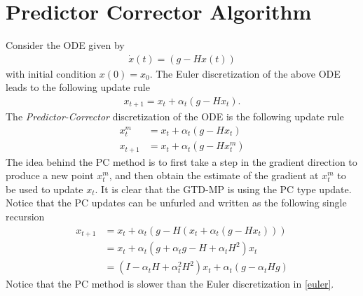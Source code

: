 \section{Predictor Corrector Algorithm}
Consider the ODE given by
\begin{align}
\dot{x}(t)=(g-Hx(t))
\end{align}
with initial condition $x(0)=x_0$. The Euler discretization of the above ODE leads to the following update rule
\begin{align}\label{euler}
x_{t+1}=x_t+\alpha_t(g-Hx_t).
\end{align}
The \emph{Predictor-Corrector} discretization of the ODE is the following update rule
\begin{align}
x^m_{t}&=x_t+\alpha_t(g-Hx_t)\\
x_{t+1}&=x_t+\alpha_t(g-Hx^m_t)
\end{align} 
The idea behind the PC method is to first take a step in the gradient direction to produce a new point $x^m_t$, and then obtain the estimate of the gradient at $x^m_t$ to be used to update $x_t$. It is clear that the GTD-MP is using the PC type update. Notice that the PC updates can be unfurled and written as the following single recursion
\begin{align}
x_{t+1}&=x_t+\alpha_t(g-H(x_t+\alpha_t(g-Hx_t)))\\
&=x_t+\alpha_t(g+\alpha_t g- H +\alpha_t H^2)x_t \\
&= (I-\alpha_t H+\alpha_t^2 H^2)x_t+\alpha_t(g-\alpha_t H g)
\end{align}
Notice that the PC method is slower than the Euler discretization in \eqref{euler}.
